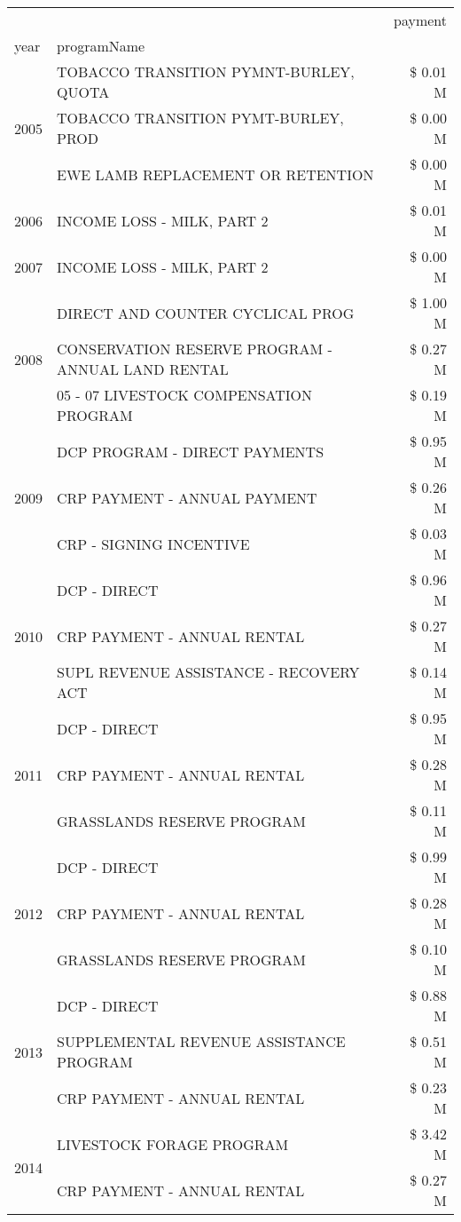 \begin{tabular}{llr}
\toprule
 &  & payment \\
year & programName &  \\
\midrule
\multirow[t]{3}{*}{2005} & TOBACCO TRANSITION PYMNT-BURLEY, QUOTA & \$ 0.01 M \\
 & TOBACCO TRANSITION PYMT-BURLEY, PROD & \$ 0.00 M \\
 & EWE LAMB REPLACEMENT OR RETENTION & \$ 0.00 M \\
\cline{1-3}
2006 & INCOME LOSS - MILK, PART 2 & \$ 0.01 M \\
\cline{1-3}
2007 & INCOME LOSS - MILK, PART 2 & \$ 0.00 M \\
\cline{1-3}
\multirow[t]{3}{*}{2008} & DIRECT AND COUNTER CYCLICAL PROG & \$ 1.00 M \\
 & CONSERVATION RESERVE PROGRAM - ANNUAL LAND RENTAL & \$ 0.27 M \\
 & 05 - 07 LIVESTOCK COMPENSATION PROGRAM & \$ 0.19 M \\
\cline{1-3}
\multirow[t]{3}{*}{2009} & DCP PROGRAM - DIRECT PAYMENTS & \$ 0.95 M \\
 & CRP PAYMENT - ANNUAL PAYMENT & \$ 0.26 M \\
 & CRP - SIGNING INCENTIVE & \$ 0.03 M \\
\cline{1-3}
\multirow[t]{3}{*}{2010} & DCP - DIRECT & \$ 0.96 M \\
 & CRP PAYMENT - ANNUAL RENTAL & \$ 0.27 M \\
 & SUPL REVENUE ASSISTANCE - RECOVERY ACT & \$ 0.14 M \\
\cline{1-3}
\multirow[t]{3}{*}{2011} & DCP - DIRECT & \$ 0.95 M \\
 & CRP PAYMENT - ANNUAL RENTAL & \$ 0.28 M \\
 & GRASSLANDS RESERVE PROGRAM & \$ 0.11 M \\
\cline{1-3}
\multirow[t]{3}{*}{2012} & DCP - DIRECT & \$ 0.99 M \\
 & CRP PAYMENT - ANNUAL RENTAL & \$ 0.28 M \\
 & GRASSLANDS RESERVE PROGRAM & \$ 0.10 M \\
\cline{1-3}
\multirow[t]{3}{*}{2013} & DCP - DIRECT & \$ 0.88 M \\
 & SUPPLEMENTAL REVENUE ASSISTANCE PROGRAM & \$ 0.51 M \\
 & CRP PAYMENT - ANNUAL RENTAL & \$ 0.23 M \\
\cline{1-3}
\multirow[t]{3}{*}{2014} & LIVESTOCK FORAGE PROGRAM & \$ 3.42 M \\
 & CRP PAYMENT - ANNUAL RENTAL & \$ 0.27 M \\

\end{tabular}

